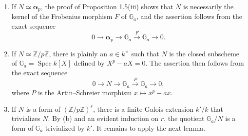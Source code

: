 \begin{enumerate}
\item[\rm(a)] If \(N\simeq\boldsymbol\alpha_p\), the proof of
  Proposition 1.5(iii) shows that \(N\) is necessarily the kernel of the
  Frobenius morphism \(F\) of \(\mathbb G_a\), and the assertion follows from
  the exact sequence
  \[
    0\longrightarrow\boldsymbol\alpha_p\longrightarrow\mathbb G_a
      \xrightarrow{F}\mathbb G_a\longrightarrow0.
  \]
\item[\rm(b)] If \(N\simeq\mathbb Z/p\mathbb Z\), there is plainly an
  \(a\in k^\times\) such that \(N\) is the closed subscheme of
  \(\mathbb G_a=\operatorname{Spec}k[X]\) defined by
  \(X^p-aX=0\).  The assertion then follows from the exact sequence
  \[
    0\longrightarrow N\longrightarrow\mathbb G_a
      \xrightarrow{P}\mathbb G_a\longrightarrow0,
  \]
  where \(P\) is the Artin--Schreier morphism \(x\mapsto x^p-ax\).
\item[\rm(c)] If \(N\) is a form of \((\mathbb Z/p\mathbb Z)^r\), there is a
  finite Galois extension \(k'/k\) that trivializes \(N\).  By (b) and an
  evident induction on \(r\), the quotient \(\mathbb G_a/N\) is a form of
  \(\mathbb G_a\) trivialized by \(k'\).  It remains to apply the next lemma.
\end{enumerate}

